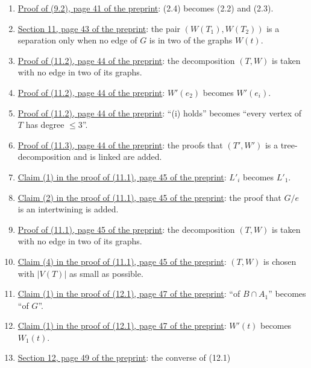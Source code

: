 \begin{enumerate}
$\Gamma$.
\item {}\hyperref[fix:9.2-proof]{Proof of (9.2), page 41 of the preprint}: (2.4) becomes (2.2) and
(2.3).
\item {}\hyperref[fix:11-separation]{Section 11, page 43 of the preprint}: the pair $(W(T_1), W(T_2))$ is a
separation only when no edge of $G$ is in two of the graphs $W(t)$.
\item {}\hyperref[fix:11.2-proof]{Proof of (11.2), page 44 of the preprint}: the decomposition $(T, W)$
is taken with no edge in two of its graphs.
\item {}\hyperref[fix:11.2-proof-linked]{Proof of (11.2), page 44 of the preprint}: $W'(e_2)$
becomes $W'(e_i)$.
\item {}\hyperref[fix:11.2-proof-end]{Proof of (11.2), page 44 of the preprint}: ``(i) holds''
becomes ``every vertex of $T$ has degree $\le 3$''.
\item {}\hyperref[fix:11.3-proof-added]{Proof of (11.3), page 44 of the preprint}: the proofs that $(T', W')$ is a tree-decomposition and is linked are added.
\item {}\hyperref[fix:11.1-claim1]{Claim (1) in the proof of (11.1), page 45 of the preprint}:
$L'_i$ becomes $L'_1$.
\item {}\hyperref[fix:11.1-claim2-proof-added]{Claim (2) in the proof of (11.1), page 45 of the preprint}: the proof that $G/e$ is an intertwining is added.
\item {}\hyperref[fix:11.1-proof]{Proof of (11.1), page 45 of the preprint}: the
decomposition $(T, W)$ is taken with no edge in two of its graphs.
\item {}\hyperref[fix:11.1-claim4]{Claim (4) in the proof of (11.1), page 45 of the preprint}:
$(T, W)$ is chosen with $|V(T)|$ as small as possible.
\item {}\hyperref[fix:12.1-claim1-G]{Claim (1) in the proof of (12.1), page 47 of the preprint}:
``of $B \cap A_1$'' becomes ``of $G$''.
\item {}\hyperref[fix:12.1-claim1-W1]{Claim (1) in the proof of (12.1), page 47 of the preprint}:
$W'(t)$ becomes $W_1(t)$.
\item {}\hyperref[fix:12-converse]{Section 12, page 49 of the preprint}: the converse of (12.1)

\end{enumerate}
